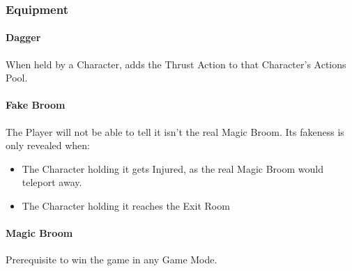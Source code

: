 \subsubsection{Equipment}


\paragraph{Dagger} When held by a Character, adds the Thrust Action to that Character's Actions Pool.

\paragraph{Fake Broom} The Player will not be able to tell it isn't the real Magic Broom. Its fakeness is only revealed when:

\begin{itemize}
	\item The Character holding it gets Injured, as the real Magic Broom would teleport away.
	\item The Character holding it reaches the Exit Room
\end{itemize}

\paragraph{Magic Broom} Prerequisite to win the game in any Game Mode.